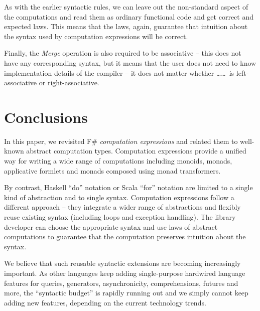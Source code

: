 \documentclass[runningheads,a4paper]{llncs}
\begin{document}
As with the earlier syntactic rules, we can leave out the non-standard aspect
of the computations and read them as ordinary functional code and get correct and 
expected laws. This means that the laws, again, guarantee that intuition about the
syntax used by computation expressions will be correct.

Finally, the \emph{Merge} operation is also required to be associative -- this does not have
any corresponding syntax, but it means that the user does not need to know implementation
details of the compiler -- it does not matter whether \ldots{}\ldots\,
is left-associative or right-associative.

\newpage

\section{Conclusions}
\label{sec:conclusions}

In this paper, we revisited F\# \emph{computation expressions} and related them to well-known 
abstract computation types. Computation expressions provide a unified way for writing a wide range 
of computations including monoids, monads, applicative formlets and monads composed using monad 
transformers.

By contrast, Haskell ``do'' notation or Scala ``for'' notation are limited to a single kind of 
abstraction and to single syntax. Computation expressions follow a different approach -- they 
integrate a wider range of abstractions and flexibly reuse existing syntax (including loops and 
exception handling). The library developer can choose the appropriate syntax and use laws of
abstract computations to guarantee that the computation preserves intuition about the syntax.

We believe that such reusable syntactic extensions are becoming increasingly important. As other
languages keep adding single-purpose hardwired language features for queries, generators, 
asynchronicity, comprehensions, futures and more, the ``syntactic budget'' is rapidly running out
and we simply cannot keep adding new features, depending on the current technology trends.



%
%

\vspace{-1em}


\end{document}
